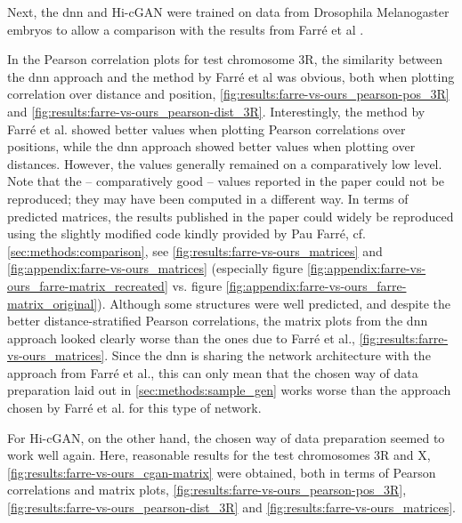 Next, the \acrshort{dnn} and Hi-cGAN were trained on data from Drosophila Melanogaster embryos
to allow a comparison with the results from Farr\'e et al \cite{Farre2018a}.

In the Pearson correlation plots for test chromosome 3R, the similarity between the \acrshort{dnn} approach and the method by 
Farré et al was obvious, both when plotting correlation over distance and position, \cref{fig:results:farre-vs-ours_pearson-pos_3R} 
and \ref{fig:results:farre-vs-ours_pearson-dist_3R}. 
Interestingly, the method by Farré et al. showed better values when plotting Pearson correlations over positions,
while the \acrshort{dnn} approach showed better values when plotting over distances. 
However, the values generally remained on a comparatively low level.
Note that the -- comparatively good -- values reported in the paper \cite[fig.~3]{Farre2018a} could not be reproduced; 
they may have been computed in a different way.
In terms of predicted matrices, the results published in the paper could widely be reproduced using the slightly modified 
code kindly provided by Pau Farré, cf. \ref{sec:methods:comparison}, see \cref{fig:results:farre-vs-ours_matrices} and \ref{fig:appendix:farre-vs-ours_matrices} 
(especially figure \ref{fig:appendix:farre-vs-ours_farre-matrix_recreated} vs. figure \ref{fig:appendix:farre-vs-ours_farre-matrix_original}).
Although some structures were well predicted, and despite the better distance-stratified Pearson correlations, 
the matrix plots from the \acrshort{dnn} approach looked clearly worse than the ones due to Farré et al., \cref{fig:results:farre-vs-ours_matrices}.
Since the \acrlong{dnn} is sharing the network architecture with the approach from Farr\'e et al., 
this can only mean that the chosen way of data preparation laid out in \ref{sec:methods:sample_gen} 
works worse than the approach chosen by Farré et al. for this type of network.

For Hi-cGAN, on the other hand, the chosen way of data preparation seemed to work well again.
Here, reasonable results for the test chromosomes 3R and X, \cref{fig:results:farre-vs-ours_cgan-matrix} were obtained,
both in terms of Pearson correlations and matrix plots, 
\cref{fig:results:farre-vs-ours_pearson-pos_3R}, \ref{fig:results:farre-vs-ours_pearson-dist_3R} and \ref{fig:results:farre-vs-ours_matrices}.

